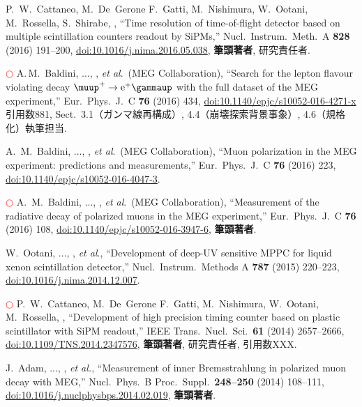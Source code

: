 \begin{enumerate}
  P.~W.~Cattaneo, M.~De~Gerone F.~Gatti, M.~Nishimura, W.~Ootani, M.~Rossella, S.~Shirabe, \me, 
  ``Time resolution of time-of-flight detector based on multiple scintillation counters readout by SiPMs,''
  Nucl.\ Instrum.\ Meth.\ A {\bf 828} (2016) 191--200,
  \href{http://dx.doi.org/10.1016/j.nima.2016.05.038}{doi:10.1016/j.nima.2016.05.038},
  \textbf{筆頭著者}, 研究責任者.

\textcolor{red}{$\bigcirc$} 
  A.\,M.~Baldini, ..., \me, {\it et al}.\ (MEG Collaboration),
  ``Search for the lepton flavour violating decay $\megc$ with the full dataset of the MEG experiment,''
  Eur.\ Phys.\ J.\ C {\bf 76} (2016) 434,
  \href{https://doi.org/10.1140/epjc/s10052-016-4271-x}{doi:10.1140/epjc/s10052-016-4271-x}
  引用数881, Sect.\ 3.1（ガンマ線再構成）, 4.4（崩壊探索背景事象）, 4.6（規格化）執筆担当.

  A.~M.~Baldini, ..., \me, {\it et al}.\ (MEG Collaboration),
  ``Muon polarization in the MEG experiment: predictions and measurements,''
  Eur.\ Phys.\ J.\ C {\bf 76} (2016) 223,
  \href{http://dx.doi.org/10.1140/epjc/s10052-016-4047-3}{doi:10.1140/epjc/s10052-016-4047-3}.

\textcolor{red}{$\bigcirc$}
  A.~M.~Baldini, ..., \me, {\it et al}.\ (MEG Collaboration),
  ``Measurement of the radiative decay of polarized muons in the MEG experiment,''
  Eur.\ Phys.\ J.\ C {\bf 76} (2016) 108,
  \href{https://doi.org/10.1140/epjc/s10052-016-3947-6}{doi:10.1140/epjc/s10052-016-3947-6},
\textbf{筆頭著者}.

  W.~Ootani, ..., \me,  {\it et al}., %
  ``Development of deep-UV sensitive MPPC for liquid xenon scintillation detector,''
  Nucl.\ Instrum.\ Methods A {\bf 787} (2015) 220--223,
  \href{https://doi.org/10.1016/j.nima.2014.12.007}{doi:10.1016/j.nima.2014.12.007}.

  \textcolor{red}{$\bigcirc$} 
  P.~W.~Cattaneo, M.~De~Gerone F.~Gatti, M.~Nishimura, W.~Ootani, M.~Rossella, \me, 
  ``Development of high precision timing counter based on plastic scintillator with SiPM readout,''
  IEEE Trans.\ Nucl.\ Sci.\ {\bf 61} (2014) 2657--2666,
  \href{http://dx.doi.org/10.1109/TNS.2014.2347576}{doi:10.1109/TNS.2014.2347576},
  \textbf{筆頭著者}, 研究責任者, 引用数XXX.

  J.~Adam, ..., \me, {\it et al.},
  ``Measurement of inner Bremsstrahlung in polarized muon decay with MEG,''
  Nucl.\ Phys.\ B Proc.\ Suppl.\ \textbf{248--250} (2014) 108--111,
  \href{https://doi.org/10.1016/j.nuclphysbps.2014.02.019}{doi:10.1016/j.nuclphysbps.2014.02.019},
  \textbf{筆頭著者}.


\end{enumerate}

